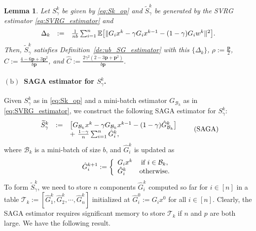 \documentclass{article}
\newcommand{\sets}[1]{\{#1\}}
\newcommand{\norms}[1]{\Vert#1\Vert}
\newcommand{\Expk}[1]{\mathbb{E}\big[#1\big]}
\newcommand{\Bc}{\mathcal{B}}
\newcommand{\Tc}{\mathcal{T}}
\newcommand{\mbf}[1]{\mathbf{#1}}
\newcommand{\beforepara}{\vspace{-1.5ex}}
\theoremstyle{plain}
\newtheorem{lemma}[theorem]{Lemma}
\theoremstyle{definition}
\theoremstyle{remark}
\begin{document}
\begin{lemma}\label{le:SVGR_estimator}
Let $S_{\gamma}^k$ be given by \eqref{eq:Sk_op} and $\widetilde{S}_{\gamma}^k$ be generated by the SVRG estimator \eqref{eq:SVRG_estimator} and
\vspace{-0.75ex}
\begin{equation*}
\begin{array}{lcl}
\Delta_k &:= &  \frac{1}{nb} \sum_{i=1}^n \Expk{ \norms{ G_ix^k - \gamma G_ix^{k-1} - (1 - \gamma) G_iw^k }^2 }.
\end{array}
\vspace{-0.75ex}
\end{equation*}
Then, $\widetilde{S}_{\gamma}^k$ satisfies Definition~\ref{de:ub_SG_estimator} with this $\sets{ \Delta_k }$, $\rho := \frac{\mbf{p} }{2}$, $C := \frac{4 - 6\mbf{p} + 3\mbf{p}^2}{b\mbf{p}}$, and $\hat{C} := \frac{2\gamma^2(2 - 3\mbf{p} + \mbf{p}^2 )}{b\mbf{p}}$.
\end{lemma}

\beforepara
\paragraph{$\mathrm{(b)}$~SAGA estimator for $S^k_{\gamma}$.}
Given $S^k_{\gamma}$ as in \eqref{eq:Sk_op} and a mini-batch estimator $G_{\Bc_k}$ as in \eqref{eq:SVRG_estimator}, we construct the following SAGA estimator for $S_{\gamma}^k$:
\vspace{-0.75ex}
\begin{equation}\label{eq:SAGA_estimator}
\begin{array}{lcl}
\widetilde{S}^k_{\gamma} & := & \big[ G_{\Bc_k}x^k - \gamma G_{\Bc_k}x^{k-1} - (1 - \gamma)\hat{G}_{\Bc_k}^k \big] \\
&& + {~} \frac{1-\gamma}{n}\sum_{i=1}^n\hat{G}_i^k, 
\end{array}
\tag{SAGA}
\vspace{-0.75ex}
\end{equation}
where $\Bc_k$ is a mini-batch of size $b$, and $\hat{G}^k_i$ is updated as
\vspace{-0.75ex}
\begin{equation}\label{eq:SAGA_ref_points}
\hat{G}_i^{k+1} := \left\{\begin{array}{lcl}
G_ix^{k} &\text{if}~ i \in \Bc_k, \\
\hat{G}_i^{k} & \text{otherwise}. %
\end{array}\right.
\vspace{-0.75ex}
\end{equation}
To form $\widetilde{S}^k_{\gamma}$, we need to store $n$ components $\hat{G}^k_i$ computed so far for $i \in [n]$ in a table $\Tc_k := [\hat{G}_1^k, \hat{G}_2^k, \cdots, \hat{G}_n^k]$ initialized at $\hat{G}_i^0 := G_ix^0$ for all $i\in [n]$.
Clearly, the SAGA estimator requires significant memory to store $\Tc_k$ if $n$ and $p$ are both large.
We have the following result.
\end{document}
